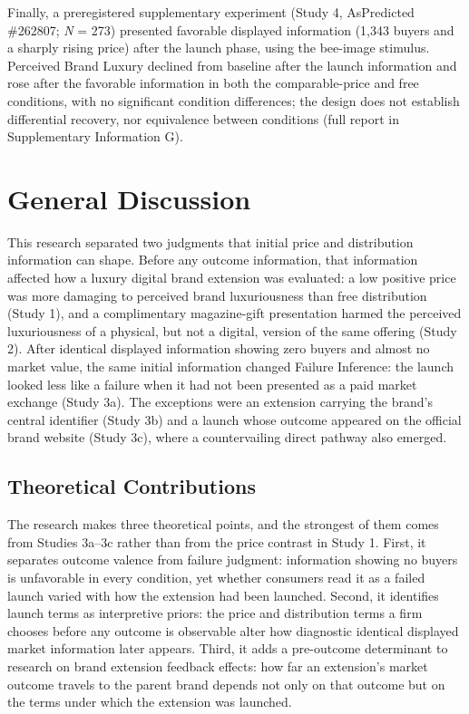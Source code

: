\documentclass[12pt, a4paper]{article}
\begin{document}
Finally, a preregistered supplementary experiment (Study 4, AsPredicted \#262807; \emph{N} = 273) presented favorable displayed information (1,343 buyers and a sharply rising price) after the launch phase, using the bee-image stimulus. Perceived Brand Luxury declined from baseline after the launch information and rose after the favorable information in both the comparable-price and free conditions, with no significant condition differences; the design does not establish differential recovery, nor equivalence between conditions (full report in Supplementary Information G).

\section{General Discussion}

This research separated two judgments that initial price and distribution information can shape. Before any outcome information, that information affected how a luxury digital brand extension was evaluated: a low positive price was more damaging to perceived brand luxuriousness than free distribution (Study 1), and a complimentary magazine-gift presentation harmed the perceived luxuriousness of a physical, but not a digital, version of the same offering (Study 2). After identical displayed information showing zero buyers and almost no market value, the same initial information changed Failure Inference: the launch looked less like a failure when it had not been presented as a paid market exchange (Study 3a). The exceptions were an extension carrying the brand's central identifier (Study 3b) and a launch whose outcome appeared on the official brand website (Study 3c), where a countervailing direct pathway also emerged.

\subsection{Theoretical Contributions}

The research makes three theoretical points, and the strongest of them comes from Studies 3a--3c rather than from the price contrast in Study 1. First, it separates outcome valence from failure judgment: information showing no buyers is unfavorable in every condition, yet whether consumers read it as a failed launch varied with how the extension had been launched. Second, it identifies launch terms as interpretive priors: the price and distribution terms a firm chooses before any outcome is observable alter how diagnostic identical displayed market information later appears. Third, it adds a pre-outcome determinant to research on brand extension feedback effects: how far an extension's market outcome travels to the parent brand depends not only on that outcome but on the terms under which the extension was launched.
\end{document}

